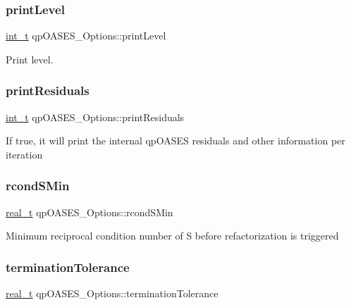 \subsubsection{\texorpdfstring{print\+Level}{printLevel}}
{\footnotesize\ttfamily \hyperlink{_types_8hpp_ab6fd6105e64ed14a0c9281326f05e623}{int\+\_\+t} qp\+O\+A\+S\+E\+S\+\_\+\+Options\+::print\+Level}

Print level. \mbox{\label{structqp_o_a_s_e_s___options_ad6ffb2216fbd2078b676a1b6aeeeabb1}} 
\subsubsection{\texorpdfstring{print\+Residuals}{printResiduals}}
{\footnotesize\ttfamily \hyperlink{_types_8hpp_ab6fd6105e64ed14a0c9281326f05e623}{int\+\_\+t} qp\+O\+A\+S\+E\+S\+\_\+\+Options\+::print\+Residuals}

If true, it will print the internal qp\+O\+A\+S\+ES residuals and other information per iteration \mbox{\label{structqp_o_a_s_e_s___options_ad8790f167af13dcfd435cd94fcde29a5}} 
\subsubsection{\texorpdfstring{rcond\+S\+Min}{rcondSMin}}
{\footnotesize\ttfamily \hyperlink{qp_o_a_s_e_s__wrapper_8h_a0d00e2b3dfadee81331bbb39068570c4}{real\+\_\+t} qp\+O\+A\+S\+E\+S\+\_\+\+Options\+::rcond\+S\+Min}

Minimum reciprocal condition number of S before refactorization is triggered \mbox{\label{structqp_o_a_s_e_s___options_a36429c6a57ce807825a7bcd2cf8c2b3b}} 
\subsubsection{\texorpdfstring{termination\+Tolerance}{terminationTolerance}}
{\footnotesize\ttfamily \hyperlink{qp_o_a_s_e_s__wrapper_8h_a0d00e2b3dfadee81331bbb39068570c4}{real\+\_\+t} qp\+O\+A\+S\+E\+S\+\_\+\+Options\+::termination\+Tolerance}

